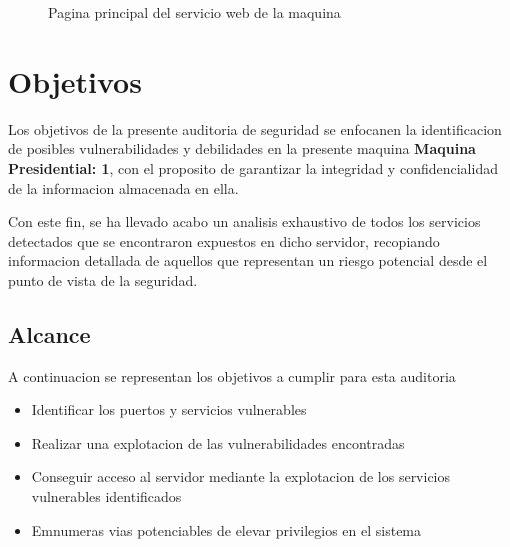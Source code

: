\documentclass[a4paper]{article} %
\newcommand{\machineName}{Maquina Presidential: 1}
\begin{document}
  \vspace{0.5cm}

  \begin{figure}[h]

    \centering
    \setlength{\fboxrule}{1.8pt}
      \caption{Pagina principal del servicio web de la maquina}
  \end{figure}

  \section{Objetivos}

  Los objetivos de la presente auditoria de seguridad se enfocanen la identificacion de posibles vulnerabilidades y debilidades en la presente maquina \textbf{\color{bluePortada}\machineName}, con el proposito de garantizar la integridad y confidencialidad de la informacion almacenada en ella.

  Con este fin, se ha llevado acabo un analisis exhaustivo de todos los servicios detectados que se encontraron expuestos en dicho servidor, recopiando informacion detallada de aquellos que representan un riesgo potencial desde el punto de vista de la seguridad.

  \clearpage
  \subsection{Alcance}
  
  A continuacion se representan los objetivos a cumplir para esta auditoria

  \begin{itemize}

    \item Identificar los puertos y servicios vulnerables
    \item Realizar una explotacion de las vulnerabilidades encontradas
    \item Conseguir acceso al servidor mediante la explotacion de los servicios vulnerables identificados
    \item Emnumeras vias potenciables de elevar privilegios en el sistema
  \end{itemize}  
\end{document}
